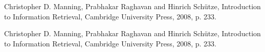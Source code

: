 \cleardoublepage
{}
{}
\begin{thebibliography}{99}

    Christopher D. Manning, Prabhakar Raghavan and Hinrich Schütze, Introduction to Information Retrieval, Cambridge University Press, 2008, p. 233.

    Christopher D. Manning, Prabhakar Raghavan and Hinrich Schütze, Introduction to Information Retrieval, Cambridge University Press, 2008, p. 233.

\end{thebibliography}
